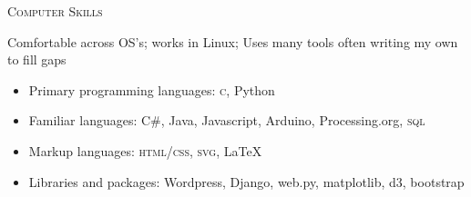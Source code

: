 \documentclass[letterpaper,10pt]{article}
\newcommand{\resumeheader}[1]{
  \vspace{0.08in}
  \textsc{\Large #1}
  \vspace{0.10in}
}
\begin{document}
\resumeheader{Computer Skills} 

Comfortable across OS's; works in Linux; Uses many tools often writing my own 
to fill gaps 
\small
\begin{itemize}[topsep=1pt, itemsep=0pt, parsep=0pt]
  \renewcommand{\labelitemi}{---}
  \item Primary programming languages: \textsc{c}, Python
  \item Familiar languages: C\#, Java, Javascript, Arduino, Processing.org, \textsc{sql}
  \item Markup languages: \textsc{html}/\textsc{css}, \textsc{svg}, \LaTeX
  \item Libraries and packages: Wordpress, Django, web.py, matplotlib, d3, bootstrap
\end{itemize}
\end{document}
